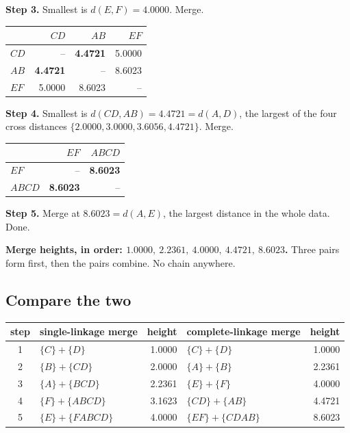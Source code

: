 \documentclass[11pt]{article}
\begin{document}
\begin{worked}
\textbf{Step 3.} Smallest is $d(E,F) = 4.0000$. Merge.
\begin{center}\small
\begin{tabular}{lrrr}
  \toprule
  & $CD$ & $AB$ & $EF$ \\
  \midrule
  $CD$ & --     & \textbf{4.4721} & 5.0000 \\
  $AB$ & \textbf{4.4721} & --     & 8.6023 \\
  $EF$ & 5.0000 & 8.6023 & -- \\
  \bottomrule
\end{tabular}
\end{center}

\textbf{Step 4.} Smallest is $d(CD, AB) = 4.4721 = d(A,D)$, the largest of the
four cross distances $\{2.0000, 3.0000, 3.6056, 4.4721\}$. Merge.
\begin{center}\small
\begin{tabular}{lrr}
  \toprule
  & $EF$ & $ABCD$ \\
  \midrule
  $EF$   & --     & \textbf{8.6023} \\
  $ABCD$ & \textbf{8.6023} & -- \\
  \bottomrule
\end{tabular}
\end{center}

\textbf{Step 5.} Merge at $8.6023 = d(A,E)$, the largest distance in the whole
data. Done.

\medskip
\textbf{Merge heights, in order: $1.0000,\ 2.2361,\ 4.0000,\ 4.4721,\
8.6023$.} Three pairs form first, then the pairs combine. No chain anywhere.
\end{worked}

\subsection{Compare the two}

\begin{center}\small
\begin{tabular}{clrlr}
  \toprule
  step & single-linkage merge & height & complete-linkage merge & height \\
  \midrule
  1 & $\{C\} + \{D\}$    & 1.0000 & $\{C\} + \{D\}$      & 1.0000 \\
  2 & $\{B\} + \{CD\}$   & 2.0000 & $\{A\} + \{B\}$      & 2.2361 \\
  3 & $\{A\} + \{BCD\}$  & 2.2361 & $\{E\} + \{F\}$      & 4.0000 \\
  4 & $\{F\} + \{ABCD\}$ & 3.1623 & $\{CD\} + \{AB\}$    & 4.4721 \\
  5 & $\{E\} + \{FABCD\}$& 4.0000 & $\{EF\} + \{CDAB\}$  & 8.6023 \\
  \bottomrule
\end{tabular}
\end{center}
\end{document}
